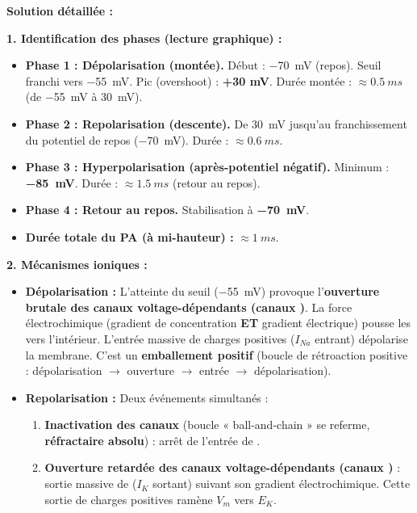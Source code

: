 \documentclass[11pt]{article}
\begin{document}
\begin{exoresolu}
\tcblower
\textbf{Solution détaillée :}

\textbf{1. Identification des phases (lecture graphique) :}
\begin{itemize}
    \item \textbf{Phase 1 : Dépolarisation (montée).} Début : \SI{-70}{mV} (repos). Seuil franchi vers \SI{-55}{mV}. Pic (overshoot) : \textbf{+30 mV}. Durée montée : \textbf{$\approx \SI{0.5}{ms}$} (de \SI{-55}{mV} à \SI{+30}{mV}).
    \item \textbf{Phase 2 : Repolarisation (descente).} De \SI{+30}{mV} jusqu'au franchissement du potentiel de repos (\SI{-70}{mV}). Durée : \textbf{$\approx \SI{0.6}{ms}$}.
    \item \textbf{Phase 3 : Hyperpolarisation (après-potentiel négatif).} Minimum : \textbf{\SI{-85}{mV}}. Durée : \textbf{$\approx \SI{1.5}{ms}$} (retour au repos).
    \item \textbf{Phase 4 : Retour au repos.} Stabilisation à \textbf{\SI{-70}{mV}}.
    \item \textbf{Durée totale du PA (à mi-hauteur) :} $\approx \SI{1}{ms}$.
\end{itemize}

\textbf{2. Mécanismes ioniques :}
\begin{itemize}
    \item \textbf{Dépolarisation :} L'atteinte du seuil (\SI{-55}{mV}) provoque l'\textbf{ouverture brutale des canaux  voltage-dépendants (canaux )}. La force électrochimique (gradient de concentration \textbf{ET} gradient électrique) pousse les  vers l'intérieur. L'entrée massive de charges positives ($I_{Na}$ entrant) dépolarise la membrane. C'est un \textbf{emballement positif} (boucle de rétroaction positive : dépolarisation $\rightarrow$ ouverture  $\rightarrow$ entrée  $\rightarrow$ dépolarisation).
    \item \textbf{Repolarisation :} Deux événements simultanés :
    \begin{enumerate}
        \item \textbf{Inactivation des canaux } (boucle « ball-and-chain » se referme, \textbf{réfractaire absolu}) : arrêt de l'entrée de .
        \item \textbf{Ouverture retardée des canaux  voltage-dépendants (canaux )} : sortie massive de  ($I_K$ sortant) suivant son gradient électrochimique. Cette sortie de charges positives ramène $V_m$ vers $E_K$.
    \end{enumerate}
\end{itemize}


\end{exoresolu}
\end{document}
